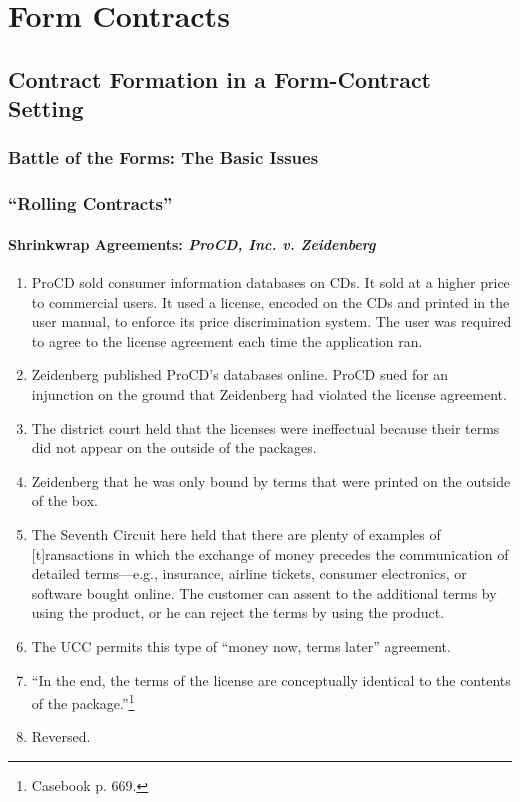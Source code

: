 \section{Form Contracts}


\subsection{Contract Formation in a Form-Contract Setting}

\subsubsection{Battle of the Forms: The Basic Issues}


\subsubsection{``Rolling Contracts''}

\paragraph{Shrinkwrap Agreements: \emph{ProCD, Inc. v. Zeidenberg}}

\begin{enumerate}
    \item ProCD sold consumer information databases on CDs. It sold at a 
    higher price to commercial users. It used a license, encoded on the CDs 
    and printed in the user manual, to enforce its price discrimination 
    system. The user was required to agree to the license agreement each time 
    the application ran.
    \item Zeidenberg published ProCD's databases online. ProCD sued for an 
    injunction on the ground that Zeidenberg had violated the license 
    agreement.
    \item The district court held that the licenses were ineffectual because 
    their terms did not appear on the outside of the packages.
    \item Zeidenberg that he was only bound by terms that were printed on the 
    outside of the box.
    \item The Seventh Circuit here held that there are plenty of examples of 
    [t]ransactions in which the exchange of money precedes the communication 
    of detailed terms---e.g., insurance, airline tickets, consumer 
    electronics, or software bought online. The customer can assent to the 
    additional terms by using the product, or he can reject the terms by using 
    the product.
    \item The UCC permits this type of ``money now, terms later'' agreement.
    \item ``In the end, the terms of the license are conceptually identical to 
    the contents of the package.''\footnote{Casebook p. 669.}
    \item Reversed.
\end{enumerate}


